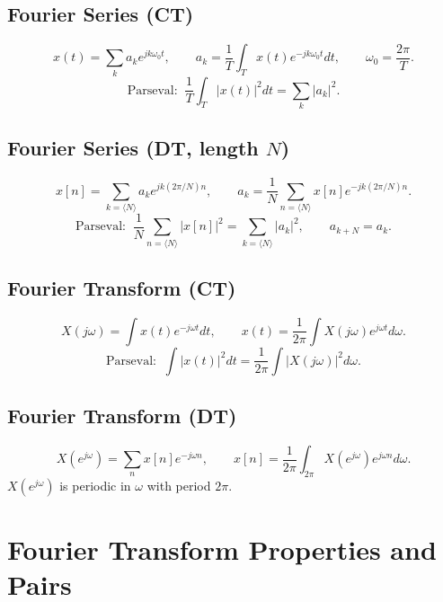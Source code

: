 \documentclass[11pt]{article}
\begin{document}
\subsection{Fourier Series (CT)}
\[ x(t)=\sum_k a_k e^{jk\omega_0 t},\qquad a_k=\frac{1}{T}\int_T x(t)e^{-jk\omega_0 t}dt,\qquad \omega_0=\frac{2\pi}{T}. \]
\[ \text{Parseval: }\ \frac{1}{T}\int_T|x(t)|^2 dt = \sum_k |a_k|^2. \]

\subsection{Fourier Series (DT, length $N$)}
\[ x[n]=\sum_{k=\langle N\rangle} a_k e^{jk(2\pi/N)n},\qquad a_k=\frac{1}{N}\sum_{n=\langle N\rangle} x[n] e^{-jk(2\pi/N)n}. \]
\[ \text{Parseval: }\ \frac{1}{N}\sum_{n=\langle N\rangle}|x[n]|^2 = \sum_{k=\langle N\rangle}|a_k|^2,\qquad a_{k+N}=a_k. \]

\subsection{Fourier Transform (CT)}
\[ X(j\omega)=\int x(t)e^{-j\omega t}dt,\qquad x(t)=\frac{1}{2\pi}\int X(j\omega)e^{j\omega t}d\omega. \]
\[ \text{Parseval: }\ \int|x(t)|^2 dt = \frac{1}{2\pi}\int|X(j\omega)|^2 d\omega. \]

\subsection{Fourier Transform (DT)}
\[ X(e^{j\omega})=\sum_n x[n]e^{-j\omega n},\qquad x[n]=\frac{1}{2\pi}\int_{2\pi}X(e^{j\omega})e^{j\omega n}d\omega. \]
$X(e^{j\omega})$ is periodic in $\omega$ with period $2\pi$.

\section{Fourier Transform Properties and Pairs}
\end{document}
